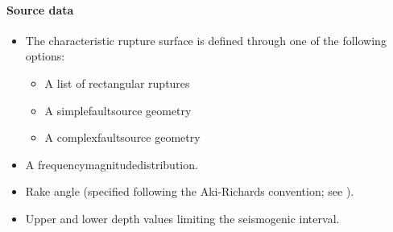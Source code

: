 \paragraph{Source data}

\begin{itemize}

    \item The characteristic rupture surface is defined through one of the
    following options:

        \begin{itemize}

            \item A list of rectangular ruptures

            \item A \gls{simplefaultsource} geometry

            \item A \gls{complexfaultsource} geometry

        \end{itemize}

    \item A \gls{frequencymagnitudedistribution}.

    \item Rake angle (specified following the Aki-Richards convention; see
          \citet{aki2002}).

    \item Upper and lower depth values limiting the seismogenic interval.

\end{itemize}
